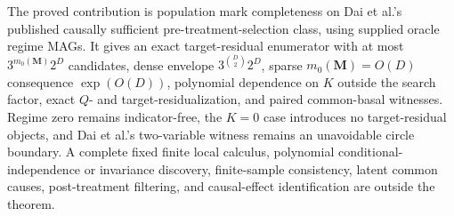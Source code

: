 \documentclass{article}
\begin{document}
The proved contribution is population mark completeness on Dai et al.'s published causally sufficient pre-treatment-selection class, using supplied oracle regime MAGs.  It gives an exact target-residual enumerator with at most \(3^{m_0(\mathbf M)}2^D\) candidates, dense envelope \(3^{\binom D2}2^D\), sparse \(m_0(\mathbf M)=O(D)\) consequence \(\exp(O(D))\), polynomial dependence on \(K\) outside the search factor, exact \(Q\)- and target-residualization, and paired common-basal witnesses.  Regime zero remains indicator-free, the \(K=0\) case introduces no target-residual objects, and Dai et al.'s two-variable witness remains an unavoidable circle boundary.  A complete fixed finite local calculus, polynomial conditional-independence or invariance discovery, finite-sample consistency, latent common causes, post-treatment filtering, and causal-effect identification are outside the theorem.
\end{document}

